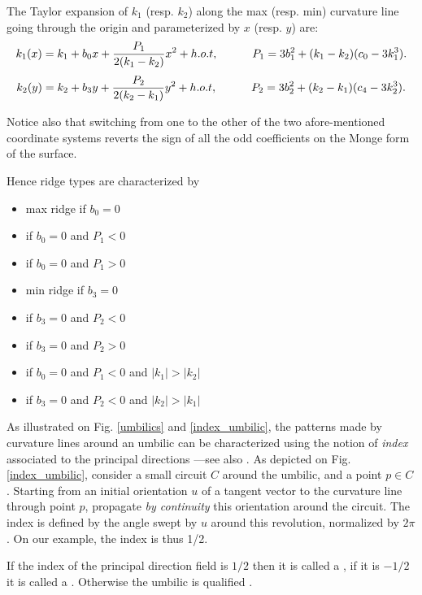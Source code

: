 \noindent The Taylor expansion of $k_1$ (resp. $k_2$) along the max
(resp. min) curvature line going through the origin and parameterized
by $x$ (resp. $y$) are:
\begin{equation}
\label{eq:taylor_along_line}
k_1(x) = k_1 + b_0x + \frac{P_1}{2(k_1-k_2)}x^2 +h.o.t , \quad \quad \quad
P_1= 3b_1^2+(k_1-k_2)(c_0-3k_1^3).
\end{equation}
%
\begin{equation}
\label{eq:taylor_along_red_line}
k_2(y) = k_2 + b_3y + \frac{P_2}{2(k_2-k_1)}y^2 +h.o.t , \quad \quad \quad
P_2= 3b_2^2+(k_2-k_1)(c_4-3k_2^3).
\end{equation}

\noindent Notice also that switching from one to the other of the two
afore-mentioned coordinate systems reverts the sign of all the odd
coefficients on the Monge form of the surface.
\medskip

Hence ridge types are characterized by 
\begin{itemize}
\item max ridge if $b_0=0$
\item {} if $b_0=0$ and $P_1<0$
\item {} if $b_0=0$ and $P_1>0$
\item min ridge if $b_3=0$
\item {} if $b_3=0$ and $P_2<0$
\item {} if $b_3=0$ and $P_2>0$
\item {} if $b_0=0$ and $P_1<0$ and $|k_1|>|k_2|$
\item {} if $b_3=0$ and $P_2<0$ and $|k_2|>|k_1|$
\end{itemize}


As illustrated on Fig. \ref{umbilics} and \ref{index_umbilic}, the
patterns made by curvature lines around an umbilic can be
characterized using the notion of {\em index} associated to the
principal directions ---see also \cite{cgal:cp-ssulc-05}.
As depicted on Fig. \ref{index_umbilic}, consider a small circuit $C$ around the
umbilic, and a point $p \in C$. Starting from an initial orientation
$u$ of a tangent vector to the curvature line through point $p$,
propagate {\em by continuity} this orientation around the circuit.  The
index is defined by the angle swept by $u$ around this revolution,
normalized by $2\pi$. On our example, the index is thus 1/2.

If the index of the principal direction field is $1/2$
then it is called a
, if it is $-1/2$ it is called a .
 Otherwise the umbilic is qualified
.


